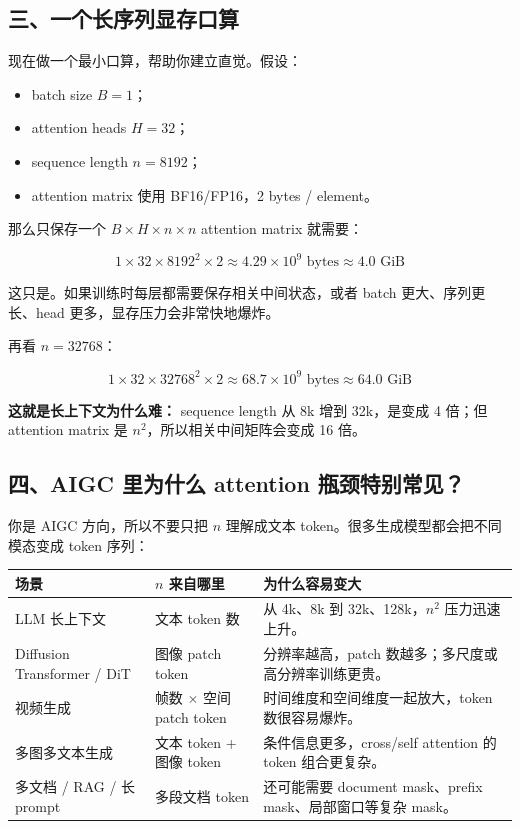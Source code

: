 \subsection{三、一个长序列显存口算}

现在做一个最小口算，帮助你建立直觉。假设：

\begin{itemize}[leftmargin=1.5em]
  \item batch size $B=1$；
  \item attention heads $H=32$；
  \item sequence length $n=8192$；
  \item attention matrix 使用 BF16/FP16，2 bytes / element。
\end{itemize}

那么只保存一个 $B \times H \times n \times n$ attention matrix 就需要：

\[
1 \times 32 \times 8192^2 \times 2
\approx
4.29 \times 10^9 \text{ bytes}
\approx
4.0 \text{ GiB}
\]

这只是。如果训练时每层都需要保存相关中间状态，或者 batch 更大、序列更长、head 更多，显存压力会非常快地爆炸。

再看 $n=32768$：

\[
1 \times 32 \times 32768^2 \times 2
\approx
68.7 \times 10^9 \text{ bytes}
\approx
64.0 \text{ GiB}
\]

\begin{warnbox}
\textbf{这就是长上下文为什么难：} sequence length 从 8k 增到 32k，是变成 4 倍；但 attention matrix 是 $n^2$，所以相关中间矩阵会变成 16 倍。
\end{warnbox}

\subsection{四、AIGC 里为什么 attention 瓶颈特别常见？}

你是 AIGC 方向，所以不要只把 $n$ 理解成文本 token。很多生成模型都会把不同模态变成 token 序列：

\begin{center}
{\small
\begin{tabular}{p{3cm}p{4.4cm}p{5.5cm}}
\hline
\textbf{场景} & \textbf{$n$ 来自哪里} & \textbf{为什么容易变大} \\
\hline
LLM 长上下文 & 文本 token 数 & 从 4k、8k 到 32k、128k，$n^2$ 压力迅速上升。 \\
Diffusion Transformer / DiT & 图像 patch token & 分辨率越高，patch 数越多；多尺度或高分辨率训练更贵。 \\
视频生成 & 帧数 $\times$ 空间 patch token & 时间维度和空间维度一起放大，token 数很容易爆炸。 \\
多图多文本生成 & 文本 token + 图像 token & 条件信息更多，cross/self attention 的 token 组合更复杂。 \\
多文档 / RAG / 长 prompt & 多段文档 token & 还可能需要 document mask、prefix mask、局部窗口等复杂 mask。 \\
\hline
\end{tabular}
}
\end{center}

